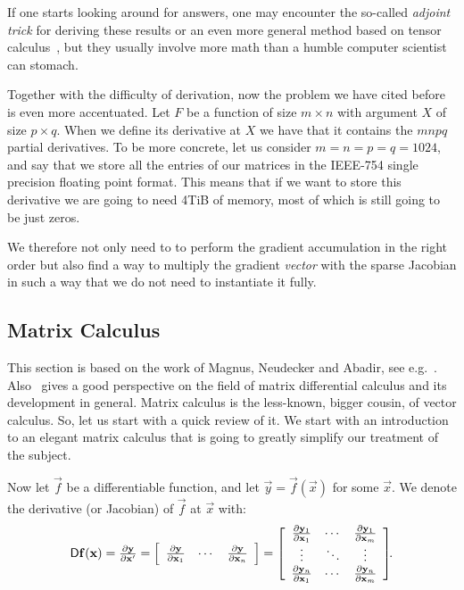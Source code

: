 \documentclass[pdflatex,sn-mathphys-num]{sn-jnl}%
\theoremstyle{thmstyleone}%
\theoremstyle{thmstyletwo}%
\theoremstyle{thmstylethree}%
\begin{document}
If one starts looking around for answers, one may encounter the so-called
\emph{adjoint trick} for deriving these results or an even more general method
based on tensor calculus~\cite{laue2018, laue2020}, but they usually involve
more math than a humble computer scientist can stomach.

Together with the difficulty of derivation, now the problem we have cited before
is even more accentuated.  Let \(F\) be a function of size \(m \times n\) with
argument \(X\) of size \(p \times q\).  When we define its derivative at \(X\)
we have that it contains the \(mnpq\) partial derivatives. To be more concrete,
let us consider \(m=n=p=q=1024\), and say that we store all the entries of our
matrices in the IEEE-754 single precision floating point format.  This means
that if we want to store this derivative we are going to need 4TiB of memory,
most of which is still going to be just zeros.

We therefore not only need to to perform the gradient accumulation in the right
order but also find a way to multiply the gradient \emph{vector} with the sparse
Jacobian in such a way that we do not need to instantiate it fully.

\subsection{Matrix Calculus}\label{sec:matcalc}

This section is based on the work of Magnus, Neudecker and Abadir, see
e.g.~\cite{neudecker1969,magnus1985, magnus2005, magnus2007, magnus2010,
magnus2019}.  Also~\cite{liu2022} gives a good perspective on the field of
matrix differential calculus and its development in general.  Matrix calculus is
the less-known, bigger cousin, of vector calculus. So, let us start with a quick
review of it.  We start with an introduction to an elegant matrix
calculus that is going to greatly simplify our treatment of the subject.

Now let \(\vec f\) be a differentiable function, and let \(\vec y = \vec f(\vec
x)\) for some \(\vec x\). We denote the derivative (or Jacobian) of \(\vec f\) at \(\vec x\) with: \[
    \mathop{}\!\mathsf D\mathbf{f}(\mathbf{x})
    = \textstyle\frac{\partial\mathbf{y}}{\partial\mathbf{x}'}
    = \left[\begin{array}{ccc}
        \textstyle\frac{\partial\mathbf{y}}{\partial\mathbf{x}_1} & \cdots & \textstyle\frac{\partial\mathbf{y}}{\partial\mathbf{x}_n}
    \end{array}\right]
    = \left[\begin{array}{ccc}
        \textstyle\frac{\partial\mathbf{y}_1}{\partial\mathbf{x}_1} & \cdots & \textstyle\frac{\partial\mathbf{y}_1}{\partial\mathbf{x}_m} \\
        \vdots & \ddots & \vdots \\
        \textstyle\frac{\partial\mathbf{y}_n}{\partial\mathbf{x}_1} & \cdots & \textstyle\frac{\partial\mathbf{y}_n}{\partial\mathbf{x}_m}
    \end{array}\right]\!\!.
\] 
\end{document}
